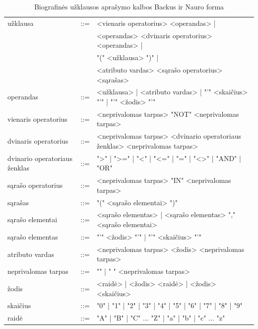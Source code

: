 \begin{table}[H]\footnotesize
	\centering
	\begin{tabular}{|l c l|}
		\hline
		užklausa                      & ::= & <vienaris operatorius> <operandas> | \\
									  &     & \multicolumn{1}{l|}{<operandas> <dvinaris operatorius> <operandas> |} \\
									  &     & \multicolumn{1}{l|}{"(" <užklausa> ")" |} \\
									  &     & \multicolumn{1}{l|}{ <atributo vardas> <sąrašo operatorius> <sąrašas>} \\
		operandas                     & ::= & <užklausa> | <atributo vardas> | "'" <skaičius> "'" | "'" <žodis> "'" \\
		vienaris operatorius          & ::= & <neprivalomas tarpas> "NOT" <neprivalomas tarpas> \\
		dvinaris operatorius          & ::= & <neprivalomas tarpas> <dvinario operatoriaus ženklas> <neprivalomas tarpas> \\
		dvinario operatoriaus ženklas & ::= & ">" | ">=" | "<" | "<=" | "=" | "<>" | "AND" | "OR" \\
		sąrašo operatorius            & ::= & <neprivalomas tarpas> "IN" <neprivalomas tarpas> \\
		sąrašas                       & ::= & "(" <sąrašo elementai> ")" \\
		sąrašo elementai              & ::= & <sąrašo elementas> | <sąrašo elementas> "," <sąrašo elementai> \\
		sąrašo elementas              & ::= & "'" <žodis> "'" | "'" <skaičius> "'" \\
		atributo vardas               & ::= & <neprivalomas tarpas> <žodis> <neprivalomas tarpas> \\
		neprivalomas tarpas           & ::= & "" | " " <neprivalomas tarpas> \\
		žodis                         & ::= & <raidė> | <žodis> <raidė> | <žodis> <skaičius> \\
		skaičius                      & ::= & "0" | "1" | "2" | "3" | "4" | "5" | "6" | "7" | "8" | "9" \\
		raidė                         & ::= & "A" | "B" | "C" ... "Z" | "a" | "b" | "c" ... "z"  \\
		\hline
	\end{tabular}
	\caption{Biografinės užklausos aprašymo kalbos Backus ir Nauro forma}
	\label{tab:queryBNF}
\end{table}

